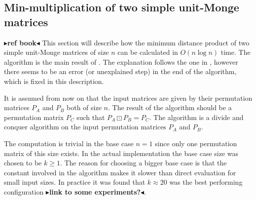 \documentclass[twoside,11pt,openright]{report}
\newcommand{\todo}[1]{{\color[rgb]{.5,0,0}\textbf{$\blacktriangleright$#1$\blacktriangleleft$}}}
\begin{document}
\subsection{Min-multiplication of two simple unit-Monge matrices}
\label{sec:algorithm:min-mult-two-unit-monge}
\todo{ref book}
This section will describe how the minimum distance product of two simple unit-Monge matrices of size $n$ can be calculated in $O(n\log{n})$ time. The algorithm is the main result of \cite{Tiskin:2010:FDM:1873601.1873704}. The explanation follows the one in \cite{Tiskin:2010:FDM:1873601.1873704}, however there seems to be an error (or unexplained step) in the end of the algorithm, which is fixed in this description.

It is assumed from now on that the input matrices are given by their permutation matrices $P_A$ and $P_B$ both of size $n$. The result of the algorithm should be a permutation matrix $P_C$ such that $P_A \boxdot P_B = P_C$. The algorithm is a divide and conquer algorithm on the input permutation matrices $P_A$ and $P_B$.

The computation is trivial in the base case $n = 1$ since only one permutation matrix of this size exists. In the actual implementation the base case size was chosen to be $k \geq 1$. The reason for choosing a bigger base case is that the constant involved in the algorithm makes it slower than direct evaluation for small input sizes. In practice it was found that $k \approx 20$ was the best performing configuration \todo{link to some experiments?}.
\end{document}
